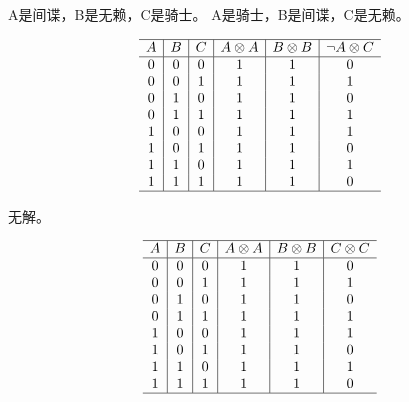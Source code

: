 {{        %
        \begin{practices}
            A是间谍，B是无赖，C是骑士。
            A是骑士，B是间谍，C是无赖。

            \begin{table}[H]
                \[
                    \begin{array}{c|c|c|c|c|c}
                        \hline
                        A & B & C & A \otimes A & B \otimes B & \neg A \otimes C \\
                        \hline
                        0 & 0 & 0 & 1 & 1 & 0 \\
                        0 & 0 & 1 & 1 & 1 & 1 \\
                        0 & 1 & 0 & 1 & 1 & 0 \\
                        0 & 1 & 1 & 1 & 1 & 1 \\
                        1 & 0 & 0 & 1 & 1 & 1 \\
                        1 & 0 & 1 & 1 & 1 & 0 \\
                        1 & 1 & 0 & 1 & 1 & 1 \\
                        1 & 1 & 1 & 1 & 1 & 0 \\
                        \hline
                   \end{array}
               \]
            \end{table}
        \end{practices}

        \begin{practices}
            无解。

            \begin{table}[H]
                \[
                    \begin{array}{c|c|c|c|c|c}
                        \hline
                        A & B & C & A \otimes A & B \otimes B & C \otimes C \\
                        \hline
                        0 & 0 & 0 & 1 & 1 & 0 \\
                        0 & 0 & 1 & 1 & 1 & 1 \\
                        0 & 1 & 0 & 1 & 1 & 0 \\
                        0 & 1 & 1 & 1 & 1 & 1 \\
                        1 & 0 & 0 & 1 & 1 & 1 \\
                        1 & 0 & 1 & 1 & 1 & 0 \\
                        1 & 1 & 0 & 1 & 1 & 1 \\
                        1 & 1 & 1 & 1 & 1 & 0 \\
                        \hline
                   \end{array}
               \]
            \end{table}
        \end{practices}

}}
